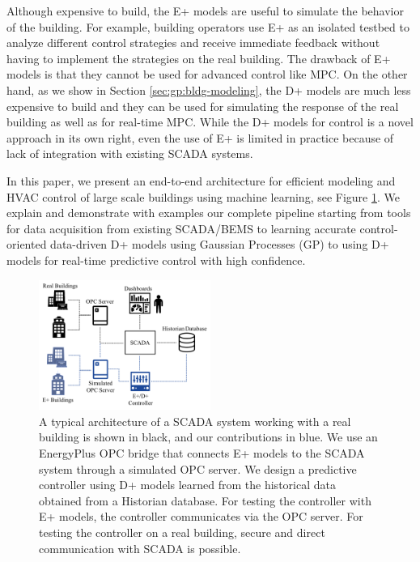 Although expensive to build, the E+ models are useful to simulate the behavior of the building. For example, building operators use E+ as an isolated testbed to analyze different control strategies and receive immediate feedback without having to implement the strategies on the real building.
The drawback of E+ models is that they cannot be used for advanced control like MPC.
On the other hand, as we show in Section \ref{sec:gp:bldg-modeling}, the D+ models are much less expensive to build and they can be used for simulating the response of the real building as well as for real-time MPC.
While the D+ models for control is a novel approach in its own right, even the use of E+ is limited in practice because of lack of integration with existing SCADA systems.

In this paper, we present an end-to-end architecture for efficient modeling and HVAC control of large scale buildings using machine learning, see Figure \ref{F:intro}. 
We explain and demonstrate with examples our complete pipeline starting from tools for data acquisition from existing SCADA/BEMS to learning accurate control-oriented data-driven D+ models using Gaussian Processes (GP) to using D+ models for real-time predictive control with high confidence.

\begin{figure}[t]
	\includegraphics[width=0.5\textwidth]{images/overview.png}
	\caption{A typical architecture of a SCADA system working with a real building is shown in black, and our contributions in blue. We use an EnergyPlus OPC bridge that connects E+ models to the SCADA system through a simulated OPC server. We design a predictive controller using D+ models learned from the historical data obtained from a Historian database. For testing the controller with E+ models, the controller communicates via the OPC server. For testing the controller on a real building, secure and direct communication with SCADA is possible.}
	\label{F:intro}
\end{figure}
